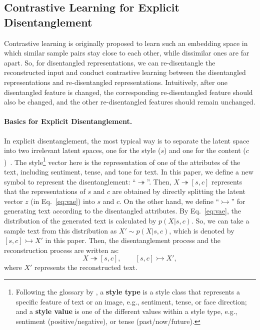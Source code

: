 \documentclass[11pt,a4paper]{article}
\renewcommand{\cite}{\citep}
\begin{document}
\subsection{Contrastive Learning for Explicit Disentanglement}

Contrastive learning is originally proposed to learn such an embedding space in which similar sample pairs stay close to each other, while dissimilar ones are far apart. So, for disentangled representations, we can re-disentangle the reconstructed input and conduct contrastive learning between the disentangled representations and re-disentangled representations. Intuitively, after one disentangled feature is changed, the corresponding re-disentangled feature should also be changed, and the other re-disentangled features should remain unchanged. 


\paragraph{Basics for Explicit Disentanglement.}
In explicit disentanglement, the most typical way is to separate the latent space into two irrelevant latent spaces, one for the style ($s$) and one for the content ($c$)~\cite{john-etal-2019-disentangled,sha2021multi}. 
The style\footnote{Following the glossary by , a \textbf{style type} is a style class that represents a
specific feature of text or an image, e.g., sentiment, tense, or
face direction; and a \textbf{style value} is one of the different values within a style type, e.g., sentiment (positive/negative), or
tense (past/now/future). }  vector here is the representation of one of the attributes of the text, including  sentiment, tense, and tone for text. In this paper, we define a new symbol to represent the disentanglement: ``$\twoheadrightarrow$''. Then, $X\twoheadrightarrow [s, c]$ represents that the representations of $s$ and $c$ are obtained by directly splitting the latent vector $z$ (in Eq.~\eqref{eq:vae}) into $s$ and $c$. On the other hand, we  define ``$\rightarrowtail$'' for generating text according to the disentangled attributes. 
By Eq.~\eqref{eq:vae}, the distribution of the generated text is calculated by $p(X|s,c)$. So, we can take a sample text from this distribution as  $X' \sim p(X|s,c)$, which is denoted by $[s, c]\rightarrowtail X'$ in this paper.
Then, the disentanglement process and the reconstruction process are written  as:
\begin{equation}\label{eq:recon_ori}
    X \twoheadrightarrow [s, c], \qquad [s, c]\rightarrowtail X',
\end{equation}
where $X'$ represents the reconstructed text.
\end{document}
